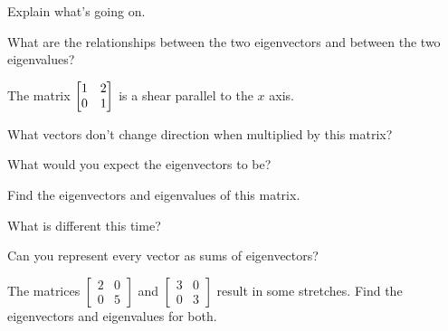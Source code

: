 \documentclass[../gatm_answers.tex]{subfiles}
\begin{document}
\begin{inner_problem}
\item Explain what's going on.
\end{inner_problem}

\begin{inner_problem}
\item What are the relationships between the two eigenvectors and between the two eigenvalues?
\end{inner_problem}

\begin{outer_problem}
\item The matrix $\begin{bmatrix} 1 & 2 \\ 0 & 1 \end{bmatrix}$ is a shear parallel to the $x$ axis.
\end{outer_problem}

\begin{inner_problem}[start=1]
\item What vectors don't change direction when multiplied by this matrix?
\end{inner_problem}

\begin{inner_problem}
\item What would you expect the eigenvectors to be?
\end{inner_problem}

\begin{inner_problem}
\item Find the eigenvectors and eigenvalues of this matrix.
\end{inner_problem}

\begin{inner_problem}
\item What is different this time?
\end{inner_problem}

\begin{inner_problem}
\item Can you represent every vector as sums of eigenvectors?
\end{inner_problem}

\begin{outer_problem}
\item The matrices $\left[\begin{smallmatrix} 2 & 0 \\ 0 & 5 \end{smallmatrix}\right]$ and $\left[\begin{smallmatrix} 3 & 0 \\ 0 & 3 \end{smallmatrix}\right]$ result in some stretches. Find the eigenvectors and eigenvalues for both.
\end{outer_problem}
\end{document}
